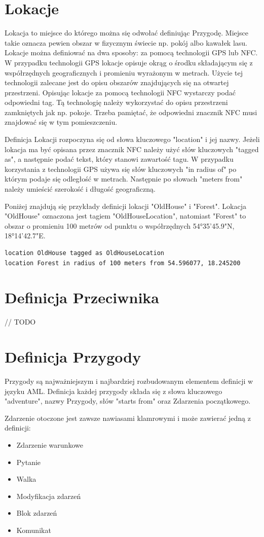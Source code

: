 \documentclass	{xmgr}
\begin{document}
\section{Lokacje}
Lokacja to miejsce do którego można się odwołać definiując Przygodę. Miejsce takie oznacza pewien obszar w fizycznym świecie np. pokój albo kawałek lasu. Lokacje można definiować na dwa sposoby: za pomocą technologii GPS lub NFC. 
W przypadku technologii GPS lokacje opisuje okrąg o środku składającym się z współrzędnych geograficznych i promieniu wyrażonym w metrach. Użycie tej technologii zalecane jest do opisu obszarów znajdujących się na otwartej przestrzeni.
Opisując lokacje za pomocą technologii NFC wystarczy podać odpowiedni tag. Tą technologię należy wykorzystać do opisu przestrzeni zamkniętych jak np. pokoje. Trzeba pamiętać, że odpowiedni znacznik NFC musi znajdować się w tym pomieszczeniu.

Definicja Lokacji rozpoczyna się od słowa kluczowego "location" i jej nazwy. Jeżeli lokacja ma być opisana przez znacznik NFC należy użyć słów kluczowych "tagged as", a następnie podać tekst, który stanowi zawartość tagu. W przypadku korzystania z technologii GPS używa się słów kluczowych "in radius of" po którym podaje się odległość w metrach. Następnie po słowach "meters from" należy umieścić szerokość i długość geograficzną.

Poniżej znajdują się przykłady definicji lokacji "OldHouse" i "Forest". Lokacja "OldHouse" oznaczona jest tagiem "OldHouseLocation", natomiast "Forest" to obszar o promieniu 100 metrów od punktu o współrzędnych 54°35'45.9"N, 18°14'42.7"E.
\begin{lstlisting}
location OldHouse tagged as OldHouseLocation
location Forest in radius of 100 meters from 54.596077, 18.245200
\end{lstlisting}

\section{Definicja Przeciwnika}
// TODO
\section{Definicja Przygody}
Przygody są najważniejszym i najbardziej rozbudowanym elementem definicji w języku AML. 
Definicja każdej przygody składa się z słowa kluczowego "adventure", nazwy Przygody, słów "starts from" oraz Zdarzenia początkowego.

Zdarzenie otoczone jest zawsze nawiasami klamrowymi i może zawierać jedną z definicji:
\begin{itemize}
	\item Zdarzenie warunkowe
	\item Pytanie
	\item Walka
	\item Modyfikacja zdarzeń
	\item Blok zdarzeń
	\item Komunikat
\end{itemize}
\end{document}
